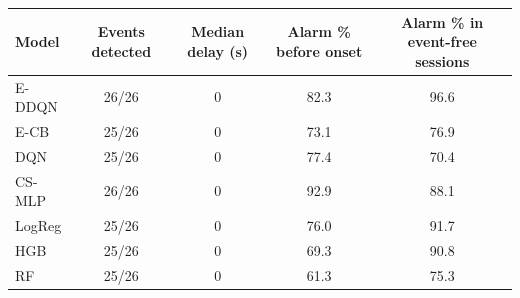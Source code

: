 \begin{tabular}{lcccc}
\toprule
Model & Events detected & Median delay (s) & Alarm \% before onset & Alarm \% in event-free sessions \\
\midrule
E-DDQN & 26/26 & 0 & 82.3 & 96.6 \\
E-CB & 25/26 & 0 & 73.1 & 76.9 \\
DQN & 25/26 & 0 & 77.4 & 70.4 \\
CS-MLP & 26/26 & 0 & 92.9 & 88.1 \\
LogReg & 25/26 & 0 & 76.0 & 91.7 \\
HGB & 25/26 & 0 & 69.3 & 90.8 \\
RF & 25/26 & 0 & 61.3 & 75.3 \\
\bottomrule
\end{tabular}
